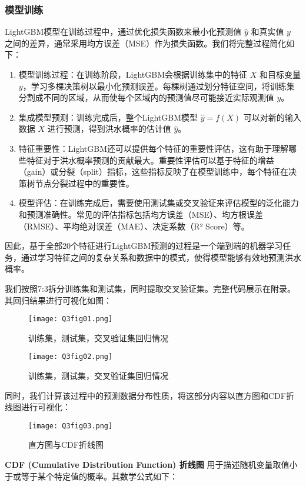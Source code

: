 \documentclass[withoutpreface,bwprint]{cumcmthesis} %
\begin{document}
\subsubsection{模型训练}
LightGBM模型在训练过程中，通过优化损失函数来最小化预测值 \( \hat{y} \) 和真实值 \( y \) 之间的差异，通常采用均方误差（MSE）作为损失函数。我们将完整过程简化如下：
\begin{enumerate}
	\item 模型训练过程：在训练阶段，LightGBM会根据训练集中的特征 \( X \) 和目标变量 \( y \)，学习多棵决策树以最小化预测误差。每棵树通过划分特征空间，将训练集分割成不同的区域，从而使每个区域内的预测值尽可能接近实际观测值 \( y \)。
	
	\item 集成模型预测：训练完成后，整个LightGBM模型 \( \hat{y} = f(X) \) 可以对新的输入数据 \( X \) 进行预测，得到洪水概率的估计值 \( \hat{y} \)。
	
	\item 特征重要性：LightGBM还可以提供每个特征的重要性评估，这有助于理解哪些特征对于洪水概率预测的贡献最大。重要性评估可以基于特征的增益（gain）或分裂（split）指标，这些指标反映了在模型训练中，每个特征在决策树节点分裂过程中的重要性。\cite{bib:nine}
	
	\item 模型评估：在训练完成后，需要使用测试集或交叉验证来评估模型的泛化能力和预测准确性。常见的评估指标包括均方误差（MSE）、均方根误差（RMSE）、平均绝对误差（MAE）、决定系数（R² Score）等。
\end{enumerate}
因此，基于全部20个特征进行LightGBM预测的过程是一个端到端的机器学习任务，通过学习特征之间的复杂关系和数据中的模式，使得模型能够有效地预测洪水概率。

我们按照7:3拆分训练集和测试集，同时提取交叉验证集。完整代码展示在附录。其回归结果进行可视化如图：
\begin{figure}[htbp]
	\centering
	\texttt{[image: Q3fig01.png]}
	\caption{训练集，测试集，交叉验证集回归情况}
	\label{Q3fig01.png}
\end{figure}
\begin{figure}[htbp]
	\centering
	\texttt{[image: Q3fig02.png]}
	\caption{训练集，测试集，交叉验证集回归情况}
	\label{Q3fig02.png}
\end{figure}

同时，我们计算该过程中的预测数据分布性质，将这部分内容以直方图和CDF折线图进行可视化：
\begin{figure}[htbp]
	\centering
	\texttt{[image: Q3fig03.png]}
	\caption{直方图与CDF折线图}
	\label{Q3fig03.png}
\end{figure}
\textbf{CDF (Cumulative Distribution Function) 折线图} 用于描述随机变量取值小于或等于某个特定值的概率。其数学公式如下：
\end{document}
